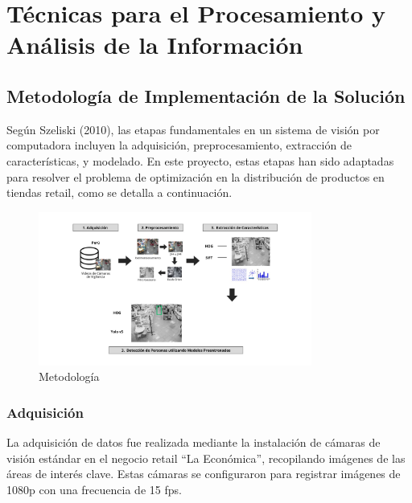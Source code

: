 
\section{Técnicas para el Procesamiento y Análisis de la Información}

\subsection{Metodología de Implementación de la Solución}

Según Szeliski (2010), las etapas fundamentales en un sistema de visión por computadora incluyen la adquisición, preprocesamiento, extracción de características, y modelado. En este proyecto, estas etapas han sido adaptadas para resolver el problema de optimización en la distribución de productos en tiendas retail, como se detalla a continuación.
\begin{figure}[H]
    \centering
    \includegraphics[width=0.8\textwidth]{3/figures/metodologia1.jpg} %
    \caption{Metodología}
    \label{fig:etiqueta_imagen} %
\end{figure}
\subsubsection{Adquisición}

La adquisición de datos fue realizada mediante la instalación de cámaras de visión estándar en el negocio retail ``La Económica'', recopilando imágenes de las áreas de interés clave. Estas cámaras se configuraron para registrar imágenes de 1080p con una frecuencia de 15 fps.

